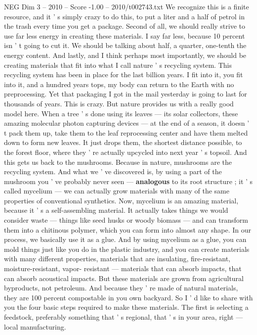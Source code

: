 \begin{textsample}{NEG Dim 3 – 2010 – Score -1.00 – 2010/t002743.txt}
We recognize this is a finite resource, and it ' s simply crazy to do this, to put a liter and a half of petrol in the trash every time you get a package.
Second of all, we should really strive to use far less energy in creating these materials.
I say far less, because 10 percent isn ' t going to cut it.
We should be talking about half, a quarter, one-tenth the energy content.
And lastly, and I think perhaps most importantly, we should be creating materials that fit into what I call nature ' s recycling system.
This recycling system has been in place for the last billion years.
I fit into it, you fit into it, and a hundred years tops, my body can return to the Earth with no preprocessing.
Yet that packaging I got in the mail yesterday is going to last for thousands of years.
This is crazy.
But nature provides us with a really good model here.
When a tree ' s done using its leaves — its solar collectors, these amazing molecular photon capturing devices — at the end of a season, it doesn ' t pack them up, take them to the leaf reprocessing center and have them melted down to form new leaves.
It just drops them, the shortest distance possible, to the forest floor, where they ' re actually upcycled into next year ' s topsoil.
And this gets us back to the mushrooms.
Because in nature, mushrooms are the recycling system.
And what we ' ve discovered is, by using a part of the mushroom you ' ve probably never seen — \textbf{analogous} to its root structure ; it ' s called mycelium — we can actually grow materials with many of the same properties of conventional synthetics.
Now, mycelium is an amazing material, because it ' s a self-assembling material.
It actually takes things we would consider waste — things like seed husks or woody biomass — and can transform them into a chitinous polymer, which you can form into almost any shape.
In our process, we basically use it as a glue.
And by using mycelium as a glue, you can mold things just like you do in the plastic industry, and you can create materials with many different properties, materials that are insulating, fire-resistant, moisture-resistant, vapor- resistant — materials that can absorb impacts, that can absorb acoustical impacts.
But these materials are grown from agricultural byproducts, not petroleum.
And because they ' re made of natural materials, they are 100 percent compostable in you own backyard.
So I ' d like to share with you the four basic steps required to make these materials.
The first is selecting a feedstock, preferably something that ' s regional, that ' s in your area, right — local manufacturing.

\end{textsample}
